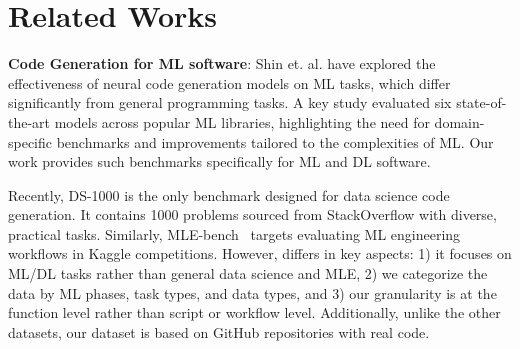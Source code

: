 \section{Related Works}

\textbf{Code Generation for ML software}: Shin et. al.\cite{shin2023good} have explored the effectiveness of neural code generation models on ML tasks, which differ significantly from general programming tasks. A key study evaluated six state-of-the-art models across popular ML libraries, highlighting the need for domain-specific benchmarks and improvements tailored to the complexities of ML. Our work provides such benchmarks specifically for ML and DL software.

Recently, DS-1000\cite{lai2023ds} is the only benchmark designed for data science code generation. It contains 1000 problems sourced from 
StackOverflow with
diverse, practical tasks. Similarly, MLE-bench~\cite{chan2024mle} targets evaluating ML engineering workflows in Kaggle competitions.
However, \tool differs in key aspects: 1) it focuses on ML/DL tasks rather than general data science and MLE, 2) we categorize the data by ML phases, task types, and data types, and 3) our granularity is at the function level rather than script or workflow level. Additionally, unlike the other datasets, our dataset is based on GitHub repositories with real code.

